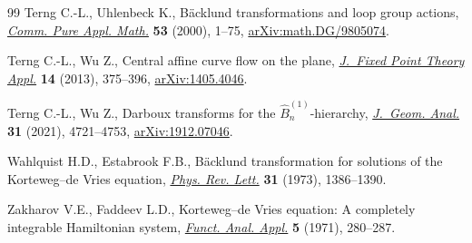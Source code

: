 \begin{thebibliography}{99}
Terng C.-L., Uhlenbeck K., B\"acklund transformations and loop group actions,
  \href{https://doi.org/10.1002/(SICI)1097-0312(200001)53:1<1::AID-CPA1>3.3.CO;2-L}{\textit{Comm. Pure Appl. Math.}} \textbf{53} (2000), 1--75,
  \href{https://arxiv.org/abs/math.DG/9805074}{arXiv:math.DG/9805074}.

Terng C.-L., Wu Z., Central affine curve flow on the plane, \href{https://doi.org/10.1007/s11784-014-0161-8}{\textit{J.~Fixed
  Point Theory Appl.}} \textbf{14} (2013), 375--396, \href{https://arxiv.org/abs/1405.4046}{arXiv:1405.4046}.

Terng C.-L., Wu Z., Darboux transforms for the {$\hat B_n^{(1)}$}-hierarchy,
  \href{https://doi.org/10.1007/s12220-020-00454-7}{\textit{J.~Geom. Anal.}} \textbf{31} (2021), 4721--4753, \href{https://arxiv.org/abs/1912.07046}{arXiv:1912.07046}.

Wahlquist H.D., Estabrook F.B., B\"acklund transformation for solutions of the
  {K}orteweg--de {V}ries equation, \href{https://doi.org/10.1103/PhysRevLett.31.1386}{\textit{Phys. Rev. Lett.}} \textbf{31}
  (1973), 1386--1390.

Zakharov V.E., Faddeev L.D., Korteweg--de {V}ries equation: {A} completely
  integrable {H}amiltonian system, \href{https://doi.org/10.1007/BF01086739}{\textit{Funct. Anal. Appl.}} \textbf{5}
  (1971), 280--287.

\end{thebibliography}

